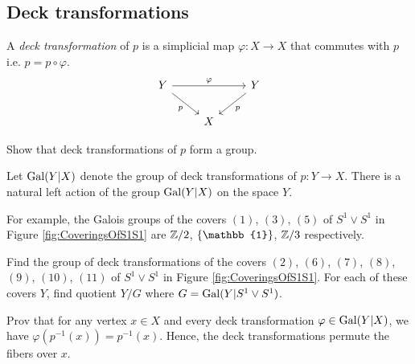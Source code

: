 \subsection{Deck transformations}




\begin{definition}
  A \emph{deck transformation} of $p$ is a simplicial map $\varphi: X \rightarrow X$ that commutes with $p$ i.e. $p = p \circ \varphi$.
  \begin{equation*}
    \begin{tikzcd}
      Y \ar[rr, "\varphi"] \ar[rd, "p"'] & & Y \ar[ld,"p"] \\
      & X
    \end{tikzcd}
  \end{equation*}
\end{definition}

\begin{qbox}
  Show that deck transformations of $p$ form a group.
\end{qbox}
Let $\operatorname{Gal}(Y|X)$ denote the group of deck transformations of $p: Y \rightarrow X$.
There is a natural left action of the group $\operatorname{Gal}(Y|X)$ on the space $Y$.

\begin{ex}
  For example, the Galois groups of the covers $(1)$, $(3)$, $(5)$ of $S^1 \vee S^1$ in Figure \ref{fig:CoveringsOfS1S1} are $\mathbb{Z}/2$, $\set{\mathbb{1}}$, $\mathbb{Z}/3$ respectively.
\end{ex}


\begin{qbox}
  Find the group of deck transformations of the covers $(2)$, $(6)$, $(7)$, $(8)$, $(9)$, $(10)$, $(11)$ of $S^1 \vee S^1$ in Figure \ref{fig:CoveringsOfS1S1}.
  For each of these covers $Y$, find quotient $Y / G$ where $G=\operatorname{Gal}(Y| S^1 \vee S^1)$.
\end{qbox}

\begin{qbox}
  Prov that for any vertex $x \in X$ and every deck transformation $\varphi \in \operatorname{Gal}(Y|X)$, we have $\varphi(p^{-1}(x)) = p^{-1}(x)$.
  Hence, the deck transformations permute the fibers over $x$.
\end{qbox}


